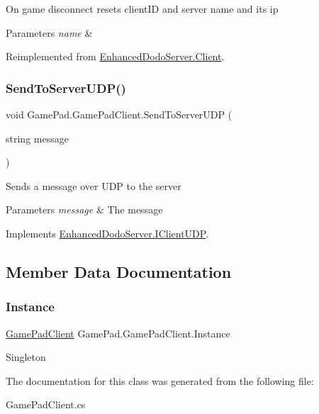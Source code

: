 On game disconnect resets client\+ID and server name and its ip 


\begin{DoxyParams}{Parameters}
{\em name} & \\
\hline
\end{DoxyParams}


Reimplemented from \mbox{\hyperlink{class_enhanced_dodo_server_1_1_client_ad033acbfece943136bd6e7aed5cfdc8c}{Enhanced\+Dodo\+Server.\+Client}}.

\mbox{\label{class_game_pad_1_1_game_pad_client_ab04a4ee4e0b53ed67a210a62b7eddeba}} 
\subsubsection{\texorpdfstring{SendToServerUDP()}{SendToServerUDP()}}
{\footnotesize\ttfamily void Game\+Pad.\+Game\+Pad\+Client.\+Send\+To\+Server\+U\+DP (\begin{DoxyParamCaption}\item[{string}]{message }\end{DoxyParamCaption})}



Sends a message over U\+DP to the server 


\begin{DoxyParams}{Parameters}
{\em message} & The message\\
\hline
\end{DoxyParams}


Implements \mbox{\hyperlink{interface_enhanced_dodo_server_1_1_i_client_u_d_p}{Enhanced\+Dodo\+Server.\+I\+Client\+U\+DP}}.



\subsection{Member Data Documentation}
\mbox{\label{class_game_pad_1_1_game_pad_client_a88e2f429bed1bf7024fbb4ff590ce5da}} 
\subsubsection{\texorpdfstring{Instance}{Instance}}
{\footnotesize\ttfamily \mbox{\hyperlink{class_game_pad_1_1_game_pad_client}{Game\+Pad\+Client}} Game\+Pad.\+Game\+Pad\+Client.\+Instance\hspace{0.3cm}{\ttfamily [static]}}



Singleton 



The documentation for this class was generated from the following file\+:\begin{DoxyCompactItemize}
\item 
Game\+Pad\+Client.\+cs\end{DoxyCompactItemize}
